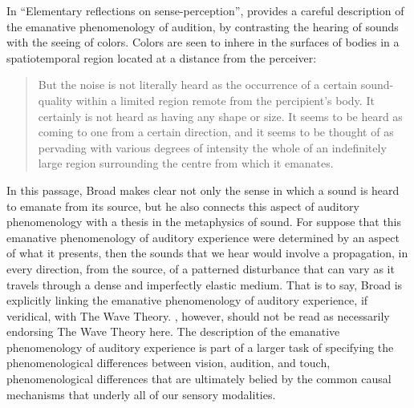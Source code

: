In ``Elementary reflections on sense-perception'', \citet{Broad:1952kx} provides a careful description of the emanative phenomenology of audition, by contrasting the hearing of sounds with the seeing of colors. Colors are seen to inhere in the surfaces of bodies in a spatiotemporal region located at a distance from the perceiver:
\begin{quote}
	But the noise is not literally heard as the occurrence of a certain sound-quality within a limited region remote from the percipient's body. It certainly is not heard as having any shape or size. It seems to be heard as coming to one from a certain direction, and it seems to be thought of as pervading with various degrees of intensity the whole of an indefinitely large region surrounding the centre from which it emanates. \citep[5]{Broad:1952kx}
\end{quote}
In this passage, Broad makes clear not only the sense in which a sound is heard to emanate from its source, but he also connects this aspect of auditory phenomenology with a thesis in the metaphysics of sound. For suppose that this emanative phenomenology of auditory experience were determined by an aspect of what it presents, then the sounds that we hear would involve a propagation, in every direction, from the source, of a patterned disturbance that can vary as it travels through a dense and imperfectly elastic medium. That is to say, Broad is explicitly linking the emanative phenomenology of auditory experience, if veridical, with The Wave Theory. \citet{Broad:1952kx}, however, should not be read as necessarily endorsing The Wave Theory here. The description of the emanative phenomenology of auditory experience is part of a larger task of specifying the phenomenological differences between vision, audition, and touch, phenomenological differences that are ultimately belied by the common causal mechanisms that underly all of our sensory modalities.


